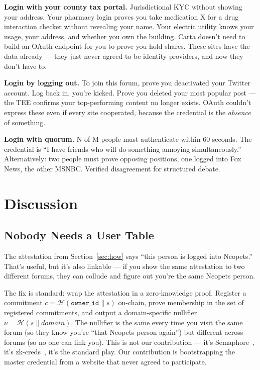 \documentclass[twocolumn,10pt]{article}
\begin{document}
\textbf{Login with your county tax portal.}
Jurisdictional KYC without showing your address.
Your pharmacy login proves you take medication X for a drug interaction checker without revealing your name.
Your electric utility knows your usage, your address, and whether you own the building.
Carta doesn't need to build an OAuth endpoint for you to prove you hold shares.
These sites have the data already --- they just never agreed to be identity providers, and now they don't have to.

\textbf{Login by logging out.}
To join this forum, prove you deactivated your Twitter account.
Log back in, you're kicked.
Prove you deleted your most popular post --- the TEE confirms your top-performing content no longer exists.
OAuth couldn't express these even if every site cooperated, because the credential is the \textit{absence} of something.

\textbf{Login with quorum.}
N of M people must authenticate within 60 seconds.
The credential is ``I have friends who will do something annoying simultaneously.''
Alternatively: two people must prove opposing positions, one logged into Fox News, the other MSNBC.
Verified disagreement for structured debate.

\section{Discussion}
\label{sec:discussion}

\subsection{Nobody Needs a User Table}

The attestation from Section~\ref{sec:how} says ``this person is logged into Neopets.''
That's useful, but it's also linkable --- if you show the same attestation to two different forums, they can collude and figure out you're the same Neopets person.

The fix is standard: wrap the attestation in a zero-knowledge proof.
Register a commitment $c = \mathcal{H}(\texttt{owner\_id} \| s)$ on-chain, prove membership in the set of registered commitments, and output a domain-specific nullifier $\nu = \mathcal{H}(s \| \textit{domain})$.
The nullifier is the same every time you visit the same forum (so they know you're ``that Neopets person again'') but different across forums (so no one can link you).
This is not our contribution --- it's Semaphore~\cite{semaphore}, it's zk-creds~\cite{zkcreds}, it's the standard play.
Our contribution is bootstrapping the master credential from a website that never agreed to participate.
\end{document}
